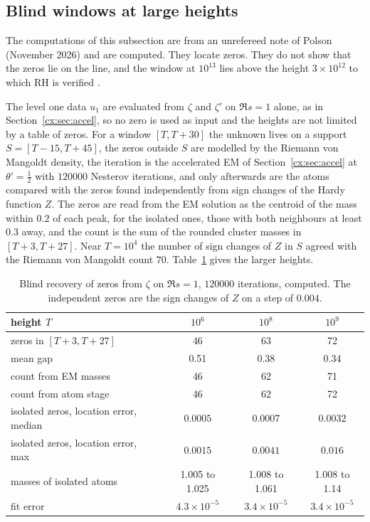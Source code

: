 \subsection{Blind windows at large heights}\label{cx:sec:blind}

The computations of this subsection are from an unrefereed note of Polson (November 2026) and are computed. They locate zeros. They do not show that the zeros lie on the line, and the window at $10^{13}$ lies above the height $3\times10^{12}$ to which RH is verified \cite{PT21}.

The level one data $u_1$ are evaluated from $\zeta$ and $\zeta'$ on $\Re s=1$ alone, as in Section~\ref{cx:sec:accel}, so no zero is used as input and the heights are not limited by a table of zeros. For a window $[T,T+30]$ the unknown lives on a support $S=[T-15,T+45]$, the zeros outside $S$ are modelled by the Riemann von Mangoldt density, the iteration is the accelerated EM of Section~\ref{cx:sec:accel} at $\theta'=\tfrac12$ with $120000$ Nesterov iterations, and only afterwards are the atoms compared with the zeros found independently from sign changes of the Hardy function $Z$. The zeros are read from the EM solution as the centroid of the mass within $0.2$ of each peak, for the isolated ones, those with both neighbours at least $0.3$ away, and the count is the sum of the rounded cluster masses in $[T+3,T+27]$. Near $T=10^4$ the number of sign changes of $Z$ in $S$ agreed with the Riemann von Mangoldt count $70$. Table~\ref{cx:tab:heights} gives the larger heights.

\begin{table}[htbp]
\centering\footnotesize
\begin{tabular}{@{}lccc@{}}
\toprule
height $T$ & $10^6$ & $10^8$ & $10^9$\\
\midrule
zeros in $[T+3,T+27]$ & 46 & 63 & 72\\
mean gap & 0.51 & 0.38 & 0.34\\
count from EM masses & 46 & 62 & 71\\
count from atom stage & 46 & 62 & 72\\
isolated zeros, location error, median & $0.0005$ & $0.0007$ & $0.0032$\\
isolated zeros, location error, max & $0.0015$ & $0.0041$ & $0.016$\\
masses of isolated atoms & 1.005 to 1.025 & 1.008 to 1.061 & 1.008 to 1.14\\
fit error & $4.3\times10^{-5}$ & $3.4\times10^{-5}$ & $3.4\times10^{-5}$\\
\bottomrule
\end{tabular}
\caption{Blind recovery of zeros from $\zeta$ on $\Re s=1$, $120000$ iterations, computed. The independent zeros are the sign changes of $Z$ on a step of $0.004$.}
\label{cx:tab:heights}
\end{table}

